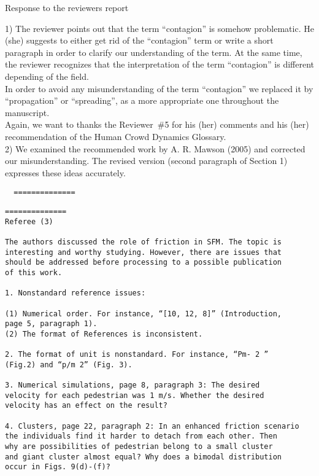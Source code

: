 \documentclass[a4paper,12pt]{letter}
\begin{document}
\begin{letter}{Response to the reviewers report}
{1) The reviewer points out that the term ``contagion'' is somehow problematic. 
He (she) suggests to either get rid of the ``contagion'' term or write a short 
paragraph in order to clarify our understanding of the term. At the same time, 
the reviewer recognizes that the interpretation of the term ``contagion'' is 
different depending of the field. \\

In order to avoid any misunderstanding of the term ``contagion'' we replaced it 
by ``propagation'' or ``spreading'', as a more appropriate one throughout the 
manuscript. \\

Again, we want to thanks the Reviewer~\#5 for his (her) comments and his 
(her) recommendation of the Human Crowd Dynamics Glossary. \\

2) We examined the recommended work by A. R. Mawson (2005) and corrected our 
misunderstanding. The revised version (second paragraph of Section 1) expresses 
these ideas accurately.   
\fi

\begin{verbatim}
  ==============
\end{verbatim}

}

\newpage

\begin{verbatim}
==============
Referee (3)

The authors discussed the role of friction in SFM. The topic is 
interesting and worthy studying. However, there are issues that 
should be addressed before processing to a possible publication 
of this work.

1. Nonstandard reference issues:

(1) Numerical order. For instance, “[10, 12, 8]” (Introduction,
page 5, paragraph 1).
(2) The format of References is inconsistent.

2. The format of unit is nonstandard. For instance, “Pm- 2 ” 
(Fig.2) and “p/m 2” (Fig. 3).

3. Numerical simulations, page 8, paragraph 3: The desired 
velocity for each pedestrian was 1 m/s. Whether the desired 
velocity has an effect on the result?

4. Clusters, page 22, paragraph 2: In an enhanced friction scenario 
the individuals find it harder to detach from each other. Then 
why are possibilities of pedestrian belong to a small cluster 
and giant cluster almost equal? Why does a bimodal distribution 
occur in Figs. 9(d)-(f)?


\end{verbatim}
\end{letter}
\end{document}
